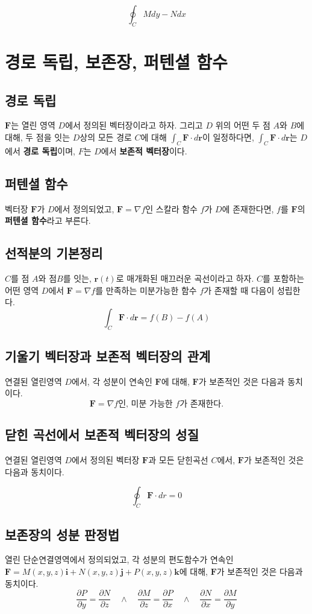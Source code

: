 \documentclass[chapter, oneside]{oblivoir}
\newcommand{\term}[1]{\textbf{#1}}
\begin{document}
$$\oint_{C} M dy - N dx$$


\section{경로 독립, 보존장, 퍼텐셜 함수}
\subsection{경로 독립}
$\textbf{F}$는 열린 영역 $D$에서 정의된 벡터장이라고 하자. 그리고 $D$ 위의 어떤 두 점 $A$와 $B$에 대해, 두 점을 잇는 ${D}$상의 모든 경로 $C$에 대해 $\int_C \textbf{F} \cdot d\textbf{r} $이 일정하다면, $\int_C \textbf{F} \cdot d\textbf{r} $는 $D$에서 \term{경로 독립}이며, $F$는 $D$에서 \term{보존적 벡터장}이다.

\subsection{퍼텐셜 함수}
벡터장 $\textbf{F}$가 $D$에서 정의되었고, $\textbf{F} = \nabla f$인 스칼라 함수 $f$가 $D$에 존재한다면, $f$를 $\textbf{F}$의 \term{퍼텐셜 함수}라고 부른다.

\subsection{선적분의 기본정리 }

$C$를 점 $A$와 점$B$를 잇는, $\textbf{r}(t)$로 매개화된 매끄러운 곡선이라고 하자. $C$를 포함하는 어떤 영역 $D$에서 $\textbf{F} = \nabla f$를 만족하는 미분가능한 함수 $f$가 존재할 때 다음이 성립한다.
$$ \int_{C} \textbf{F} \cdot d\textbf{r} = f(B)-f(A)$$

\subsection{기울기 벡터장과 보존적 벡터장의 관계}
연결된 열린영역 ${D}$에서, 각 성분이 연속인 $\textbf{F}$에 대해, $\textbf{F}$가 보존적인 것은 다음과 동치이다.
$$\textbf{F} = \nabla f \text{인, 미분 가능한 }f\text{가 존재한다.}$$


\subsection{닫힌 곡선에서 보존적 벡터장의 성질}
연결된 열린영역 $D$에서 정의된 벡터장 $\textbf{F}$과 모든 닫힌곡선 $C$에서, $\textbf{F}$가 보존적인 것은 다음과 동치이다.

$$\oint_C \textbf{F} \cdot dr=0$$

\subsection{보존장의 성분 판정법 }
열린 단순연결영역에서 정의되었고, 각 성분의 편도함수가 연속인 $\textbf{F}=M(x,y,z)\textbf{i} + N(x,y,z)\textbf{j} +P(x,y,z)\textbf{k}$에 대해, $\textbf{F}$가 보존적인 것은 다음과 동치이다.
$$ \frac{\partial P}{\partial y}=\frac{\partial N}{\partial z} \quad \land \quad \frac{\partial M}{\partial z}=\frac{\partial P}{\partial x} \quad \land \quad \frac{\partial N}{\partial x}=\frac{\partial M}{\partial y} $$
\end{document}
